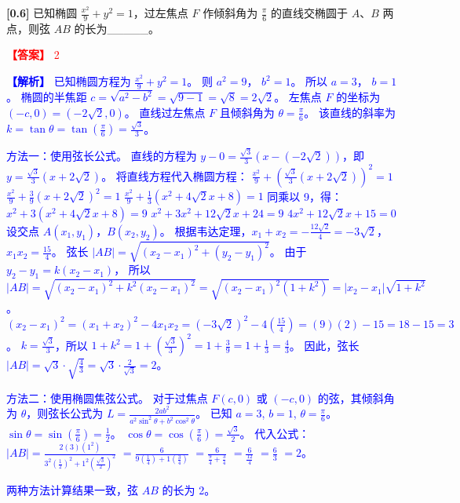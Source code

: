 \documentclass[varwidth=16cm, border=2mm]{standalone}
\begin{document}
\textbf{[0.6]} 已知椭圆 $\frac{x^2}{9} + y^2 = 1$，过左焦点 $F$ 作倾斜角为 $\frac{\pi}{6}$ 的直线交椭圆于 $A$、$B$ 两点，则弦 $AB$ 的长为_____。

\vspace{0.2cm}\par\noindent\textcolor{red}{\textbf{【答案】} 2}
\par\noindent\textcolor{blue}{\textbf{【解析】} 已知椭圆方程为 $\frac{x^2}{9} + y^2 = 1$。
则 $a^2 = 9$， $b^2 = 1$。
所以 $a = 3$， $b = 1$。
椭圆的半焦距 $c = \sqrt{a^2 - b^2} = \sqrt{9 - 1} = \sqrt{8} = 2\sqrt{2}$。
左焦点 $F$ 的坐标为 $(-c, 0) = (-2\sqrt{2}, 0)$。
直线过左焦点 $F$ 且倾斜角为 $\theta = \frac{\pi}{6}$。
该直线的斜率为 $k = \tan\theta = \tan(\frac{\pi}{6}) = \frac{\sqrt{3}}{3}$。

方法一：使用弦长公式。
直线的方程为 $y - 0 = \frac{\sqrt{3}}{3}(x - (-2\sqrt{2}))$，即 $y = \frac{\sqrt{3}}{3}(x + 2\sqrt{2})$。
将直线方程代入椭圆方程：
$\frac{x^2}{9} + (\frac{\sqrt{3}}{3}(x + 2\sqrt{2}))^2 = 1$
$\frac{x^2}{9} + \frac{3}{9}(x + 2\sqrt{2})^2 = 1$
$\frac{x^2}{9} + \frac{1}{3}(x^2 + 4\sqrt{2}x + 8) = 1$
同乘以 9，得：
$x^2 + 3(x^2 + 4\sqrt{2}x + 8) = 9$
$x^2 + 3x^2 + 12\sqrt{2}x + 24 = 9$
$4x^2 + 12\sqrt{2}x + 15 = 0$
设交点 $A(x_1, y_1)$，$B(x_2, y_2)$。
根据韦达定理，$x_1 + x_2 = -\frac{12\sqrt{2}}{4} = -3\sqrt{2}$， $x_1x_2 = \frac{15}{4}$。
弦长 $|AB| = \sqrt{(x_2-x_1)^2 + (y_2-y_1)^2}$。
由于 $y_2 - y_1 = k(x_2 - x_1)$，
所以 $|AB| = \sqrt{(x_2-x_1)^2 + k^2(x_2-x_1)^2} = \sqrt{(x_2-x_1)^2(1+k^2)} = |x_2-x_1|\sqrt{1+k^2}$。
$(x_2-x_1)^2 = (x_1+x_2)^2 - 4x_1x_2 = (-3\sqrt{2})^2 - 4(\frac{15}{4}) = (9)(2) - 15 = 18 - 15 = 3$。
$k = \frac{\sqrt{3}}{3}$，所以 $1+k^2 = 1 + (\frac{\sqrt{3}}{3})^2 = 1 + \frac{3}{9} = 1 + \frac{1}{3} = \frac{4}{3}$。
因此，弦长 $|AB| = \sqrt{3} \cdot \sqrt{\frac{4}{3}} = \sqrt{3} \cdot \frac{2}{\sqrt{3}} = 2$。

方法二：使用椭圆焦弦公式。
对于过焦点 $F(c, 0)$ 或 $(-c, 0)$ 的弦，其倾斜角为 $\theta$，则弦长公式为 $L = \frac{2ab^2}{a^2\sin^2\theta + b^2\cos^2\theta}$。
已知 $a=3$, $b=1$, $\theta = \frac{\pi}{6}$。
$\sin\theta = \sin(\frac{\pi}{6}) = \frac{1}{2}$。
$\cos\theta = \cos(\frac{\pi}{6}) = \frac{\sqrt{3}}{2}$。
代入公式：
$|AB| = \frac{2(3)(1^2)}{3^2(\frac{1}{2})^2 + 1^2(\frac{\sqrt{3}}{2})^2}$
$= \frac{6}{9(\frac{1}{4}) + 1(\frac{3}{4})}$
$= \frac{6}{\frac{9}{4} + \frac{3}{4}}$
$= \frac{6}{\frac{12}{4}}$
$= \frac{6}{3}$
$= 2$。

两种方法计算结果一致，弦 $AB$ 的长为 2。}
\end{document}

